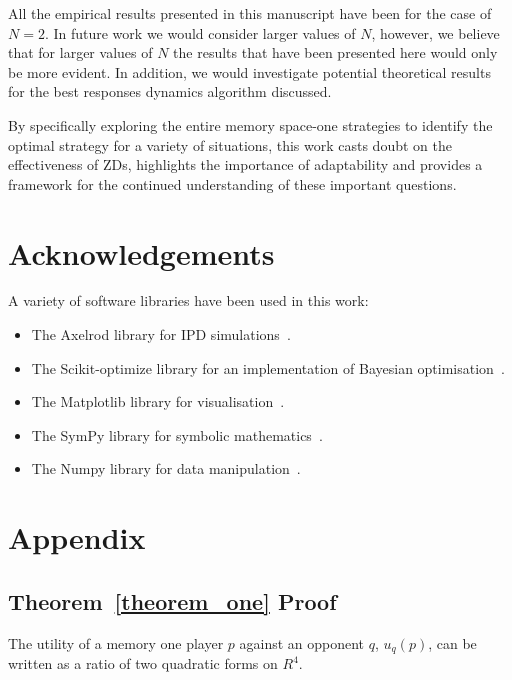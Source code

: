 \documentclass[10pt]{article}
\begin{document}
All the empirical results presented in this manuscript have been for the case of
$N=2$. In future work we would consider larger values of $N$, however, we
believe that for larger values of $N$ the results that have been presented here
would only be more evident. In addition, we would investigate potential
theoretical results for the best responses dynamics algorithm
discussed.

By specifically exploring the entire memory space-one strategies to identify
the optimal strategy for a variety of situations, this work casts doubt
on the effectiveness of ZDs, highlights the importance of adaptability and provides
a framework for the continued understanding of these important questions.

\section{Acknowledgements}

A variety of software libraries have been used in this work:

\begin{itemize}
    \item The Axelrod library for IPD simulations~\cite{axelrodproject}.
    \item The Scikit-optimize library for an implementation of Bayesian optimisation~\cite{tim_head_2018_1207017}.
    \item The Matplotlib library for visualisation~\cite{hunter2007matplotlib}.
    \item The SymPy library for symbolic mathematics~\cite{sympy}.
    \item The Numpy library for data manipulation~\cite{walt2011numpy}.
\end{itemize}




\section{Appendix}

\subsection{Theorem~\ref{theorem_one} Proof}\label{appendix:theorem_one}

The utility of a memory one player \(p\) against an opponent \(q\), \(u_q(p)\),
can be written as a ratio of two quadratic forms on \(R^4\).
\end{document}
